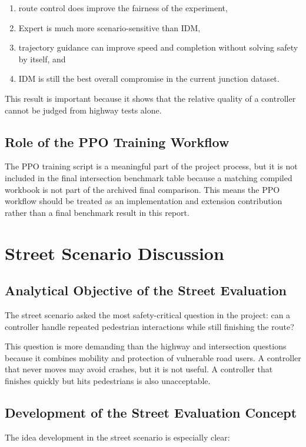 \documentclass[12pt,a4paper]{report}
\begin{document}
\begin{enumerate}[label=\arabic*.]
    \item route control does improve the fairness of the experiment,
    \item Expert is much more scenario-sensitive than IDM,
    \item trajectory guidance can improve speed and completion without solving safety by itself, and
    \item IDM is still the best overall compromise in the current junction dataset.
\end{enumerate}

This result is important because it shows that the relative quality of a controller cannot be judged from highway tests alone.

\subsection{Role of the PPO Training Workflow}
The PPO training script is a meaningful part of the project process, but it is not included in the final intersection benchmark table because a matching compiled workbook is not part of the archived final comparison. This means the PPO workflow should be treated as an implementation and extension contribution rather than a final benchmark result in this report.

\section{Street Scenario Discussion}

\subsection{Analytical Objective of the Street Evaluation}
The street scenario asked the most safety-critical question in the project: can a controller handle repeated pedestrian interactions while still finishing the route?

This question is more demanding than the highway and intersection questions because it combines mobility and protection of vulnerable road users. A controller that never moves may avoid crashes, but it is not useful. A controller that finishes quickly but hits pedestrians is also unacceptable.

\subsection{Development of the Street Evaluation Concept}
The idea development in the street scenario is especially clear:
\end{document}
